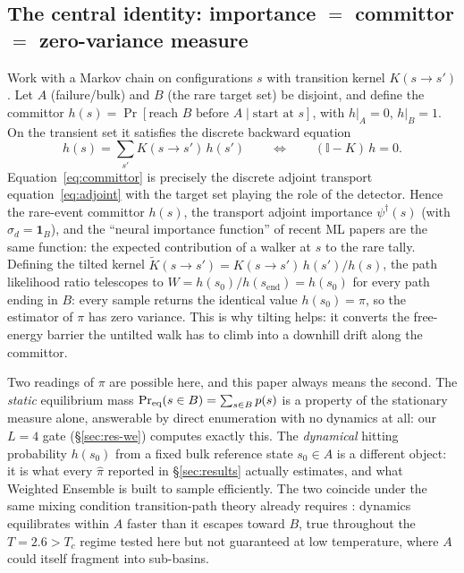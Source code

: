 \documentclass[11pt]{article}
\newcommand{\dg}{^{\dagger}}
\begin{document}
	\subsection{The central identity: importance $=$ committor $=$ zero-variance measure}
	\label{sec:identity}
	Work with a Markov chain on configurations $s$ with transition kernel $K(s\to s')$. Let $A$
	(failure/bulk) and $B$ (the rare target set) be disjoint, and define the committor
	$h(s)=\Pr[\text{reach }B\text{ before }A\mid\text{start at }s]$, with $h|_A=0$, $h|_B=1$.
	On the transient set it satisfies the discrete backward equation
	\begin{equation}
		h(s)=\sum_{s'}K(s\to s')\,h(s')\qquad\Longleftrightarrow\qquad (\mathbb I-K)\,h=0 .
		\label{eq:committor}
	\end{equation}
	Equation~\eqref{eq:committor} is precisely the discrete adjoint transport
	equation~\eqref{eq:adjoint} with the target set playing the role of the detector. Hence the
	rare-event committor $h(s)$, the transport adjoint importance $\psi\dg(s)$ (with
	$\sigma_d=\mathbf 1_B$), and the ``neural importance function'' of recent ML papers are the
	same function: the expected contribution of a walker at $s$ to the rare tally. Defining the
	tilted kernel $\widetilde K(s\to s')=K(s\to s')\,h(s')/h(s)$, the path likelihood ratio
	telescopes to $W=h(s_0)/h(s_{\text{end}})=h(s_0)$ for every path ending in $B$: every sample
	returns the identical value $h(s_0)=\pi$, so the estimator of $\pi$ has zero variance.
	This is why tilting helps: it converts the free-energy barrier the untilted walk has to
	climb into a downhill drift along the committor.

	Two readings of $\pi$ are possible here, and this paper always means the second. The
	\emph{static} equilibrium mass $\Pr_{\rm eq}(s\in B)=\sum_{s\in B}p(s)$ is a property of the
	stationary measure alone, answerable by direct enumeration with no dynamics at all: our
	$L=4$ gate (\S\ref{sec:res-we}) computes exactly this. The \emph{dynamical} hitting
	probability $h(s_0)$ from a fixed bulk reference state $s_0\in A$ is a different object: it
	is what every $\hat\pi$ reported in \S\ref{sec:results} actually estimates, and what
	Weighted Ensemble is built to sample efficiently. The two coincide under the same mixing
	condition transition-path theory already requires \cite{e2006}: dynamics equilibrates
	within $A$ faster than it escapes toward $B$, true throughout the $T=2.6>T_c$ regime tested
	here but not guaranteed at low temperature, where $A$ could itself fragment into
	sub-basins.
\end{document}
